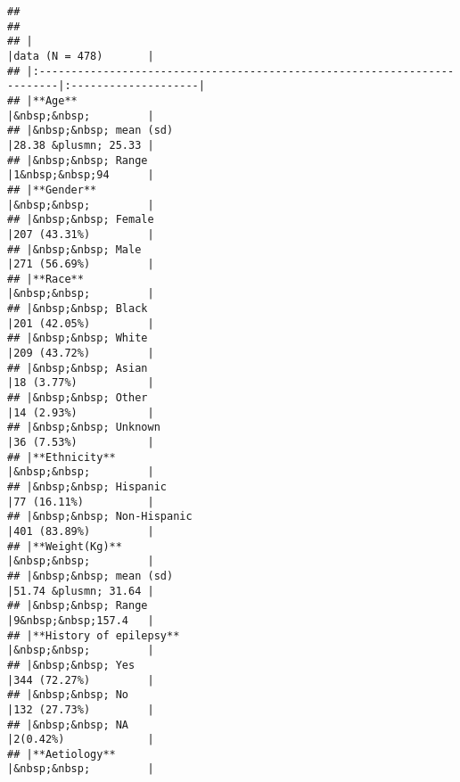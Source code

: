 \documentclass[
]{article}
\begin{document}
\begin{verbatim}
## 
## 
## |                                                                          |data (N = 478)       |
## |:-------------------------------------------------------------------------|:--------------------|
## |**Age**                                                                   |&nbsp;&nbsp;         |
## |&nbsp;&nbsp; mean (sd)                                                    |28.38 &plusmn; 25.33 |
## |&nbsp;&nbsp; Range                                                        |1&nbsp;&nbsp;94      |
## |**Gender**                                                                |&nbsp;&nbsp;         |
## |&nbsp;&nbsp; Female                                                       |207 (43.31%)         |
## |&nbsp;&nbsp; Male                                                         |271 (56.69%)         |
## |**Race**                                                                  |&nbsp;&nbsp;         |
## |&nbsp;&nbsp; Black                                                        |201 (42.05%)         |
## |&nbsp;&nbsp; White                                                        |209 (43.72%)         |
## |&nbsp;&nbsp; Asian                                                        |18 (3.77%)           |
## |&nbsp;&nbsp; Other                                                        |14 (2.93%)           |
## |&nbsp;&nbsp; Unknown                                                      |36 (7.53%)           |
## |**Ethnicity**                                                             |&nbsp;&nbsp;         |
## |&nbsp;&nbsp; Hispanic                                                     |77 (16.11%)          |
## |&nbsp;&nbsp; Non-Hispanic                                                 |401 (83.89%)         |
## |**Weight(Kg)**                                                            |&nbsp;&nbsp;         |
## |&nbsp;&nbsp; mean (sd)                                                    |51.74 &plusmn; 31.64 |
## |&nbsp;&nbsp; Range                                                        |9&nbsp;&nbsp;157.4   |
## |**History of epilepsy**                                                   |&nbsp;&nbsp;         |
## |&nbsp;&nbsp; Yes                                                          |344 (72.27%)         |
## |&nbsp;&nbsp; No                                                           |132 (27.73%)         |
## |&nbsp;&nbsp; NA                                                           |2(0.42%)             |
## |**Aetiology**                                                             |&nbsp;&nbsp;         |

\end{verbatim}
\end{document}
